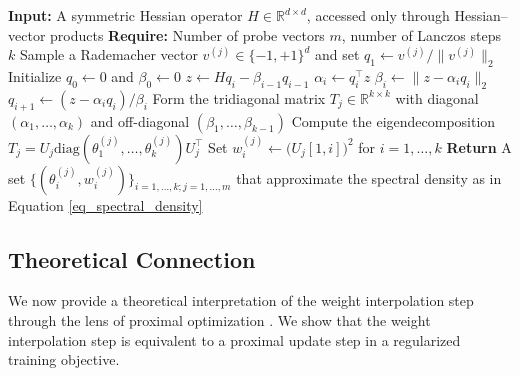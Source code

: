 \documentclass{article}
\theoremstyle{definition}
\newcommand{\norm}[1]{\|#1\|}
\begin{document}
\begin{algorithm}[t!]
\caption{Stochastic Lanczos Quadrature (SLQ) for estimating the Hessian spectrum}
\label{alg:slq}
\begin{algorithmic}[1]
\STATE \textbf{Input:} A symmetric Hessian operator $H \in \mathbb{R}^{d \times d}$, accessed only through Hessian--vector products
\STATE \textbf{Require:} Number of probe vectors $m$, number of Lanczos steps $k$
    \STATE Sample a Rademacher vector $v^{(j)} \in \{-1,+1\}^d$ and set $q_1 \gets v^{(j)}/\|v^{(j)}\|_2$
    \STATE Initialize $q_0 \gets 0$ and $\beta_0 \gets 0$
        \STATE $z \gets H q_i - \beta_{i-1} q_{i-1}$ 
        \STATE $\alpha_i \gets q_i^\top z$
        \STATE $\beta_i \gets \norm{z - \alpha_i q_i}_2$
        \STATE $q_{i+1} \gets (z - \alpha_i q_i) / \beta_i$
    \ENDFOR
    \STATE Form the tridiagonal matrix $T_j \in \mathbb{R}^{k \times k}$ with diagonal $(\alpha_1, \dots, \alpha_k)$ and off-diagonal $(\beta_1, \dots, \beta_{k-1})$
    \STATE Compute the eigendecomposition $T_j = U_j  \mathrm{diag}(\theta_1^{(j)}, \dots, \theta_k^{(j)})  U_j^\top$
    \STATE Set $w_i^{(j)} \gets \big(U_j[1, i]\big)^2$ for $i = 1, \dots, k$ 
\ENDFOR
\STATE \textbf{Return} A set $\{(\theta_i^{(j)}, w_i^{(j)})\}_{i=1,\dots,k; j=1,\dots,m}$ that approximate the spectral density as in Equation \ref{eq_spectral_density}
\end{algorithmic}
\end{algorithm}

\subsection{Theoretical Connection}\label{sec_theoretical_interpretation}

We now provide a theoretical interpretation of the weight interpolation step through the lens of proximal optimization \cite{bai2018proxquant}. We show that the weight interpolation step is equivalent to a proximal update step in a regularized training objective.
\end{document}
